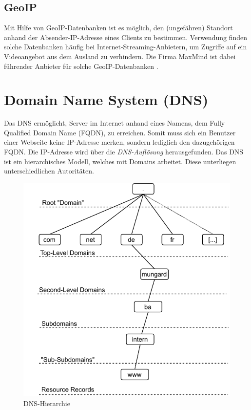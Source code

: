 \subsection{GeoIP}
Mit Hilfe von GeoIP-Datenbanken ist es möglich, den (ungefähren) Standort anhand der Absender-IP-Adresse eines Clients zu bestimmen. Verwendung finden solche Datenbanken häufig bei Internet-Streaming-Anbietern, um Zugriffe auf ein Videoangebot aus dem Ausland zu verhindern. Die Firma MaxMind ist dabei führender Anbieter für solche GeoIP-Datenbanken \cite{maxmind2021geoip}.

\section{Domain Name System (DNS)}\label{DNS}
Das DNS ermöglicht, Server im Internet anhand eines Namens, dem Fully Qualified Domain Name (FQDN), zu erreichen. Somit muss sich ein Benutzer einer Webseite keine IP-Adresse merken, sondern lediglich den dazugehörigen FQDN. Die IP-Adresse wird über die \textit{DNS-Auflösung} herausgefunden. Das DNS ist ein hierarchisches Modell, welches mit Domains arbeitet. Diese unterliegen unterschiedlichen Autoritäten. 
\begin{figure}[h]
  \centering
  \includegraphics{Figures/dns_autoritative.pdf}
  \caption{DNS-Hierarchie}
  \label{grafik: dns-hierarchy}
\end{figure}\FloatBarrier

